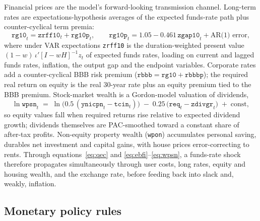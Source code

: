 Financial prices are the model's forward-looking transmission channel. Long-term rates are expectations-hypothesis averages of the expected funds-rate path plus counter-cyclical term premia:
\begin{equation}
\texttt{rg10}_t = \texttt{zrff10}_t + \texttt{rg10p}_t, \qquad
\texttt{rg10p}_t = 1.05 - 0.461\,\texttt{zgap10}_t + \text{AR(1) error},
\label{eq:rg10}
\end{equation}
where under VAR expectations \texttt{zrff10} is the duration-weighted present value $(1-w)\,\iota'[I-wH]^{-1}z_t$ of expected funds rates, loading on current and lagged funds rates, inflation, the output gap and the endpoint variables. Corporate rates add a counter-cyclical BBB risk premium ($\texttt{rbbb}=\texttt{rg10}+\texttt{rbbbp}$); the required real return on equity is the real 30-year rate plus an equity premium tied to the BBB premium. Stock-market wealth is a Gordon-model valuation of dividends,
\begin{equation}
\ln \texttt{wpsn}_t \;=\; \ln\big(0.5\,(\texttt{ynicpn}_t-\texttt{tcin}_t)\big) \;-\; 0.25\,\big(\texttt{req}_t-\texttt{zdivgr}_t\big) \;+\; \text{const},
\label{eq:wpsn}
\end{equation}
so equity values fall when required returns rise relative to expected dividend growth; dividends themselves are PAC-smoothed toward a constant share of after-tax profits. Non-equity property wealth (\texttt{wpon}) accumulates personal saving, durables net investment and capital gains, with house prices error-correcting to rents. Through equations~\eqref{eq:qec} and \eqref{eq:ebfi}--\eqref{eq:wpsn}, a funds-rate shock therefore propagates simultaneously through user costs, long rates, equity and housing wealth, and the exchange rate, before feeding back into slack and, weakly, inflation.

\subsection{Monetary policy rules}
\label{sec:rules}

